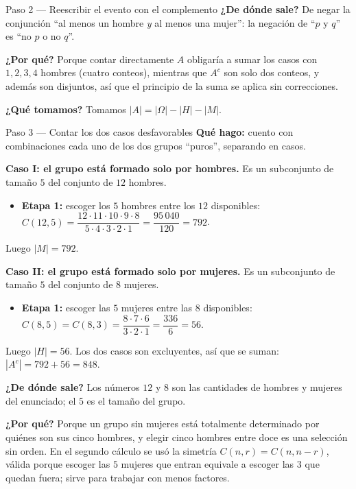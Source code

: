 \documentclass[11pt]{article}
\begin{document}
\begin{sol}
\begin{paso}{Paso 2 --- Reescribir el evento con el complemento}
\textbf{¿De d\'onde sale?} De negar la conjunci\'on ``al menos un hombre \emph{y} al menos una mujer'': la negaci\'on de ``$p$ y $q$'' es ``no $p$ o no $q$''.

\textbf{¿Por qu\'e?} Porque contar directamente $A$ obligar\'ia a sumar los casos con $1,2,3,4$ hombres (cuatro conteos), mientras que $A^{c}$ son solo dos conteos, y adem\'as son disjuntos, as\'i que el principio de la suma se aplica sin correcciones.

\textbf{¿Qu\'e tomamos?} Tomamos $|A| = |\Omega| - |H| - |M|$.
\end{paso}

\begin{paso}{Paso 3 --- Contar los dos casos desfavorables}
\textbf{Qu\'e hago:} cuento con combinaciones cada uno de los dos grupos ``puros'', separando en casos.

\medskip
\textbf{Caso I: el grupo est\'a formado solo por hombres.} Es un subconjunto de tama\~no $5$ del conjunto de $12$ hombres.
\begin{itemize}[leftmargin=*]
  \item \textbf{Etapa 1:} escoger los $5$ hombres entre los $12$ disponibles: $C(12,5)=\dfrac{12\cdot 11\cdot 10\cdot 9\cdot 8}{5\cdot 4\cdot 3\cdot 2\cdot 1}=\dfrac{95\,040}{120}=792$.
\end{itemize}
Luego $|M|=792$.

\medskip
\textbf{Caso II: el grupo est\'a formado solo por mujeres.} Es un subconjunto de tama\~no $5$ del conjunto de $8$ mujeres.
\begin{itemize}[leftmargin=*]
  \item \textbf{Etapa 1:} escoger las $5$ mujeres entre las $8$ disponibles: $C(8,5)=C(8,3)=\dfrac{8\cdot 7\cdot 6}{3\cdot 2\cdot 1}=\dfrac{336}{6}=56$.
\end{itemize}
Luego $|H|=56$. Los dos casos son excluyentes, as\'i que se suman: $|A^{c}|=792+56=848$.

\textbf{¿De d\'onde sale?} Los n\'umeros $12$ y $8$ son las cantidades de hombres y mujeres del enunciado; el $5$ es el tama\~no del grupo.

\textbf{¿Por qu\'e?} Porque un grupo sin mujeres est\'a totalmente determinado por qui\'enes son sus cinco hombres, y elegir cinco hombres entre doce es una selecci\'on sin orden. En el segundo c\'alculo se us\'o la simetr\'ia $C(n,r)=C(n,n-r)$, v\'alida porque escoger las $5$ mujeres que entran equivale a escoger las $3$ que quedan fuera; sirve para trabajar con menos factores.


\end{paso}
\end{sol}
\end{document}
